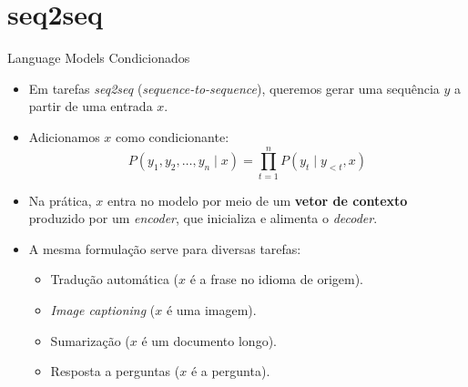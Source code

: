 \documentclass[aspectratio=169,xcolor=dvipsnames]{beamer}
\begin{document}
\section{seq2seq}

\begin{frame}{Language Models Condicionados}
\begin{itemize}
    \item Em tarefas \textit{seq2seq} (\textit{sequence-to-sequence}), queremos gerar uma sequência $y$ a partir de uma entrada $x$.
    \item Adicionamos $x$ como condicionante:
    \begin{equation*}
        P(y_1, y_2, \dots, y_n \mid x) = \prod_{t=1}^{n} P(y_t \mid y_{<t}, x)
    \end{equation*}
    \item Na prática, $x$ entra no modelo por meio de um \textbf{vetor de contexto} produzido por um \textit{encoder}, que inicializa e alimenta o \textit{decoder}.
    \item A mesma formulação serve para diversas tarefas:
    \begin{itemize}
        \item Tradução automática ($x$ é a frase no idioma de origem).
        \item \textit{Image captioning} ($x$ é uma imagem).
        \item Sumarização ($x$ é um documento longo).
        \item Resposta a perguntas ($x$ é a pergunta).
    \end{itemize}
\end{itemize}
\end{frame}
\end{document}
